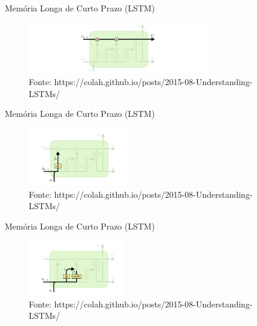 \documentclass[
  ignorenonframetext,
]{beamer}
\begin{document}
\begin{frame}{Memória Longa de Curto Prazo (LSTM)}
\label{memuxf3ria-longa-de-curto-prazo-lstm-4}
\begin{figure}[H]

{\centering \includegraphics[width=3.13in,height=\textheight]{interconexao_info.png}

}

\caption{Fonte:
https://colah.github.io/posts/2015-08-Understanding-LSTMs/}

\end{figure}%
\end{frame}

\begin{frame}{Memória Longa de Curto Prazo (LSTM)}
\label{memuxf3ria-longa-de-curto-prazo-lstm-5}
\begin{figure}[H]

{\centering \includegraphics[width=1.69in,height=\textheight]{primeira_funcao.png}

}

\caption{Fonte:
https://colah.github.io/posts/2015-08-Understanding-LSTMs/}

\end{figure}%
\end{frame}

\begin{frame}{Memória Longa de Curto Prazo (LSTM)}
\label{memuxf3ria-longa-de-curto-prazo-lstm-6}
\begin{figure}[H]

{\centering \includegraphics[width=1.66in,height=\textheight]{segunda_funcao.png}

}

\caption{Fonte:
https://colah.github.io/posts/2015-08-Understanding-LSTMs/}

\end{figure}%
\end{frame}
\end{document}
